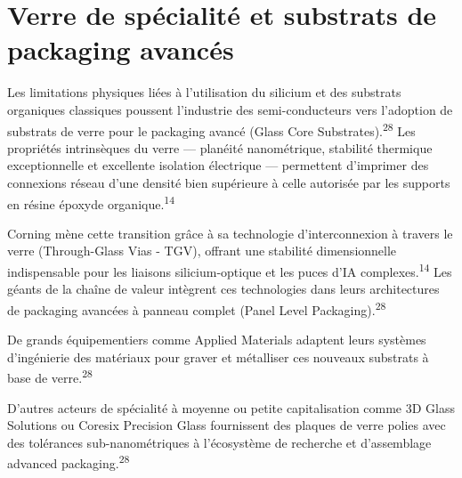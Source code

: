 \documentclass[11pt,a4paper]{article}
\begin{document}
\section*{Verre de spécialité et substrats de packaging avancés}

Les limitations physiques liées à l'utilisation du silicium et des substrats organiques classiques poussent l'industrie des semi-conducteurs vers l'adoption de substrats de verre pour le packaging avancé (Glass Core Substrates).\textsuperscript{28} Les propriétés intrinsèques du verre — planéité nanométrique, stabilité thermique exceptionnelle et excellente isolation électrique — permettent d'imprimer des connexions réseau d'une densité bien supérieure à celle autorisée par les supports en résine époxyde organique.\textsuperscript{14}

Corning mène cette transition grâce à sa technologie d'interconnexion à travers le verre (Through-Glass Vias - TGV), offrant une stabilité dimensionnelle indispensable pour les liaisons silicium-optique et les puces d'IA complexes.\textsuperscript{14} Les géants de la chaîne de valeur intègrent ces technologies dans leurs architectures de packaging avancées à panneau complet (Panel Level Packaging).\textsuperscript{28}

De grands équipementiers comme Applied Materials adaptent leurs systèmes d'ingénierie des matériaux pour graver et métalliser ces nouveaux substrats à base de verre.\textsuperscript{28}

D'autres acteurs de spécialité à moyenne ou petite capitalisation comme 3D Glass Solutions ou Coresix Precision Glass fournissent des plaques de verre polies avec des tolérances sub-nanométriques à l'écosystème de recherche et d'assemblage advanced packaging.\textsuperscript{28}
\end{document}
